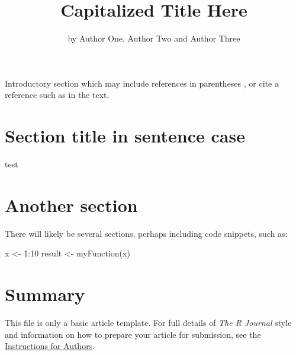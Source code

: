 \title{Capitalized Title Here}
\author{by Author One, Author Two and Author Three}

\maketitle


Introductory section which may include references in parentheses
\citep{R}, or cite a reference such as \citet{R} in the text.

\section{Section title in sentence case}

test

%

\section{Another section}

There will likely be several sections, perhaps including code snippets, such as:

\begin{example}
  x <- 1:10
  result <- myFunction(x)
\end{example}

\section{Summary}

This file is only a basic article template. For full details of \emph{The R Journal} style and information on how to prepare your article for submission, see the \href{http://journal.r-project.org/latex/RJauthorguide.pdf}{Instructions for Authors}.



\address{Author One\\
  Affiliation\\
  Address\\
  Country\\}

\address{Author Two\\
  Affiliation\\
  Address\\
  Country\\}

\address{Author Three\\
  Affiliation\\
  Address\\
  Country\\}

